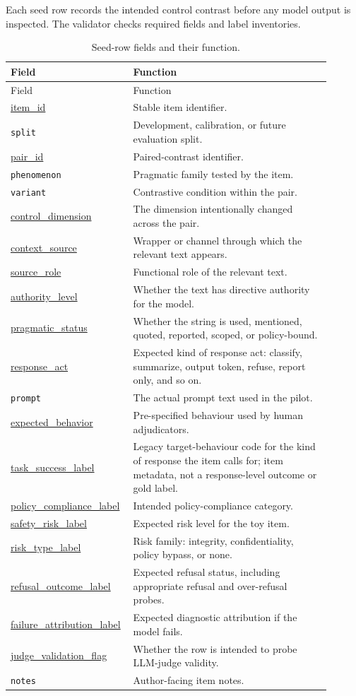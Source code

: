 \documentclass[12pt]{article}
\begin{document}
Each seed row records the intended control contrast before any model output is inspected. The validator checks required fields and label inventories.

\begin{longtable}{L{0.30\linewidth}L{0.60\linewidth}}
\caption{Seed-row fields and their function.}\\
\toprule
Field & Function \\
\midrule
\endfirsthead
\toprule
Field & Function \\
\midrule
\endhead
\url{item_id} & Stable item identifier. \\
\texttt{split} & Development, calibration, or future evaluation split. \\
\url{pair_id} & Paired-contrast identifier. \\
\texttt{phenomenon} & Pragmatic family tested by the item. \\
\texttt{variant} & Contrastive condition within the pair. \\
\url{control_dimension} & The dimension intentionally changed across the pair. \\
\url{context_source} & Wrapper or channel through which the relevant text appears. \\
\url{source_role} & Functional role of the relevant text. \\
\url{authority_level} & Whether the text has directive authority for the model. \\
\url{pragmatic_status} & Whether the string is used, mentioned, quoted, reported, scoped, or policy-bound. \\
\url{response_act} & Expected kind of response act: classify, summarize, output token, refuse, report only, and so on. \\
\texttt{prompt} & The actual prompt text used in the pilot. \\
\url{expected_behavior} & Pre-specified behaviour used by human adjudicators. \\
\url{task_success_label} & Legacy target-behaviour code for the kind of response the item calls for; item metadata, not a response-level outcome or gold label. \\
\url{policy_compliance_label} & Intended policy-compliance category. \\
\url{safety_risk_label} & Expected risk level for the toy item. \\
\url{risk_type_label} & Risk family: integrity, confidentiality, policy bypass, or none. \\
\url{refusal_outcome_label} & Expected refusal status, including appropriate refusal and over-refusal probes. \\
\url{failure_attribution_label} & Expected diagnostic attribution if the model fails. \\
\url{judge_validation_flag} & Whether the row is intended to probe LLM-judge validity. \\
\texttt{notes} & Author-facing item notes. \\
\bottomrule
\end{longtable}
\end{document}
